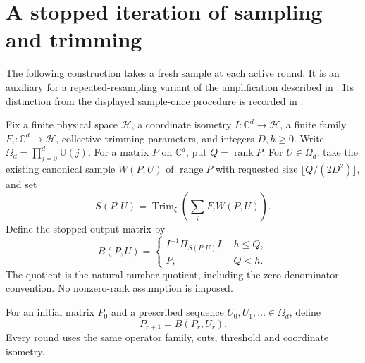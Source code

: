 \section{A stopped iteration of sampling and trimming}

The following construction takes a fresh sample at each active round.
It is an auxiliary for a repeated-resampling variant of the amplification
described in \cite{Arad2016RigorousRG}. Its distinction from the displayed
sample-once procedure is recorded in
\cite{gap:alvv16_bootstrap_constants}.

\begin{definition}
    \label{def:canonical_stopped_half_sample_trim}
    \leanok
    Fix a finite physical space $\mathcal H$, a coordinate isometry
    $I:\mathbb C^d\to\mathcal H$, a finite family
    $F_i:\mathbb C^d\to\mathcal H$, collective-trimming parameters,
    and integers $D,h\ge0$. Write
    $\Omega_d=\prod_{j=0}^d\mathrm U(j)$.
    For a matrix $P$ on $\mathbb C^d$, put $Q=\operatorname{rank}P$.
    For $U\in\Omega_d$, take the existing canonical sample
    $W(P,U)$ of $\operatorname{range}P$ with requested size
    $\lfloor Q/(2D^2)\rfloor$, and set
    \[
        S(P,U)=\operatorname{Trim}_\xi\left(\sum_iF_iW(P,U)\right).
    \]
    Define the stopped output matrix by
    \[
        B(P,U)=
        \begin{cases}
            I^{-1}\Pi_{S(P,U)}I, & h\le Q, \\
            P,                   & Q<h.
        \end{cases}
    \]
    The quotient is the natural-number quotient, including the
    zero-denominator convention. No nonzero-rank assumption is imposed.
\end{definition}

\begin{definition}
    \label{def:canonical_stopped_half_sample_iteration}
    \leanok
    For an initial matrix $P_0$ and a prescribed sequence
    $U_0,U_1,\ldots\in\Omega_d$, define
    \[
        P_{r+1}=B(P_r,U_r).
    \]
    Every round uses the same operator family, cuts, threshold and
    coordinate isometry.
\end{definition}

